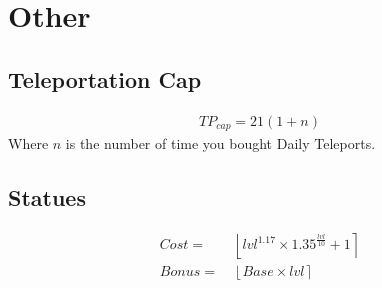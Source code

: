 \chapter{Other}

\section{Teleportation Cap}
    \begin{align*}
        {TP}_{cap} = 21(1+n)
    \end{align*}
    Where $n$ is the number of time you bought Daily Teleports.

\section{Statues}
    \begin{align*}
        Cost = &\
            \left\lfloor 
            lvl^{1.17} \times 1.35^{\frac{lvl}{10}}+1 
            \right\rceil 
        \\ 
        Bonus = &\
        \left\lfloor 
        Base \times lvl
        \right\rceil 
    \end{align*}

